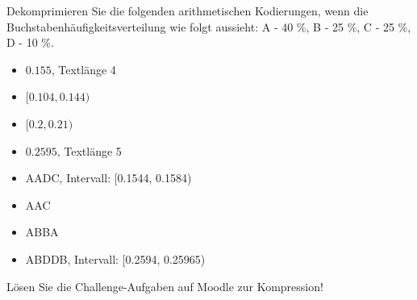 \begin{myexercise}
	Dekomprimieren Sie die folgenden arithmetischen Kodierungen, wenn die Buchstabenhäufigkeitsverteilung wie folgt aussieht: A - 40 \%, B - 25 \%, C - 25 \%, D - 10 \%.
	\begin{itemize}
		\item $0.155$, Textlänge 4
		\item $[0.104, 0.144)$
		\item $[0.2, 0.21)$
		\item $0.2595$, Textlänge 5
	\end{itemize}
	\begin{myanswer}
		\begin{itemize}
			\item AADC, Intervall: [0.1544, 0.1584)
			\item AAC
			\item ABBA
			\item ABDDB, Intervall: [0.2594, 0.25965)
		\end{itemize}
	\end{myanswer}
\end{myexercise}

\begin{mychallenge}
	Lösen Sie die Challenge-Aufgaben auf Moodle zur Kompression!
\end{mychallenge}